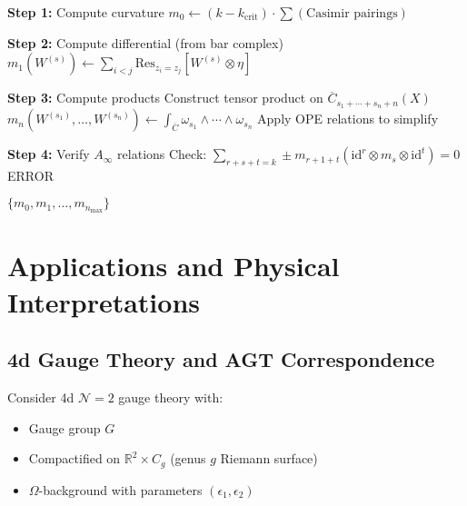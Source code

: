 \begin{principle}
\begin{algorithm}[H]
\begin{algorithmic}[1]
\State
\State \textbf{Step 1:} Compute curvature
\State $m_0 \gets (k - k_{\text{crit}}) \cdot \sum (\text{Casimir pairings})$

\State
\State \textbf{Step 2:} Compute differential (from bar complex)
    \State $m_1(W^{(s)}) \gets \sum_{i<j} \mathrm{Res}_{z_i=z_j}[W^{(s)} \otimes \eta]$
\EndFor

\State
\State \textbf{Step 3:} Compute products
        \State Construct tensor product on $\overline{C}_{s_1+\cdots+s_n+n}(X)$
        \State $m_n(W^{(s_1)}, \ldots, W^{(s_n)}) \gets \int_{\overline{C}} \omega_{s_1} \wedge \cdots \wedge \omega_{s_n}$
        \State Apply OPE relations to simplify
    \EndFor
\EndFor

\State
\State \textbf{Step 4:} Verify $A_\infty$ relations
    \State Check: $\sum_{r+s+t=k} \pm m_{r+1+t}(\mathrm{id}^r \otimes m_s \otimes \mathrm{id}^t) = 0$
        \State \Return ERROR
    \EndIf
\EndFor

\State
\Return $\{m_0, m_1, \ldots, m_{n_{\max}}\}$
\end{algorithmic}
\end{algorithm}

\section{Applications and Physical Interpretations}

\subsection{4d Gauge Theory and AGT Correspondence}

\begin{theorem}\label{thm:agt-w-algebra}
Consider 4d $\mathcal{N}=2$ gauge theory with:
\begin{itemize}
\item Gauge group $G$
\item Compactified on $\mathbb{R}^2 \times C_g$ (genus $g$ Riemann surface)
\item $\Omega$-background with parameters $(\epsilon_1, \epsilon_2)$
\end{itemize}


\end{theorem}
\end{principle}

